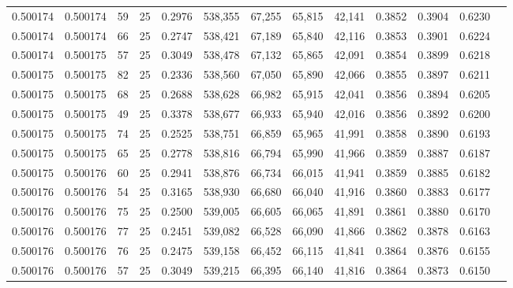\begin{tabular}{rrrrrrrrrrrrr}
0.500174 & 0.500174 &    59 &  25 &                                     0.2976 & 538,355 &  67,255 &  65,815 &  42,141 & 0.3852 & 0.3904 & 0.6230 \\
0.500174 & 0.500174 &    66 &  25 &                                     0.2747 & 538,421 &  67,189 &  65,840 &  42,116 & 0.3853 & 0.3901 & 0.6224 \\
0.500174 & 0.500175 &    57 &  25 &                                     0.3049 & 538,478 &  67,132 &  65,865 &  42,091 & 0.3854 & 0.3899 & 0.6218 \\
0.500175 & 0.500175 &    82 &  25 &                                     0.2336 & 538,560 &  67,050 &  65,890 &  42,066 & 0.3855 & 0.3897 & 0.6211 \\
0.500175 & 0.500175 &    68 &  25 &                                     0.2688 & 538,628 &  66,982 &  65,915 &  42,041 & 0.3856 & 0.3894 & 0.6205 \\
0.500175 & 0.500175 &    49 &  25 &                                     0.3378 & 538,677 &  66,933 &  65,940 &  42,016 & 0.3856 & 0.3892 & 0.6200 \\
0.500175 & 0.500175 &    74 &  25 &                                     0.2525 & 538,751 &  66,859 &  65,965 &  41,991 & 0.3858 & 0.3890 & 0.6193 \\
0.500175 & 0.500175 &    65 &  25 &                                     0.2778 & 538,816 &  66,794 &  65,990 &  41,966 & 0.3859 & 0.3887 & 0.6187 \\
0.500175 & 0.500176 &    60 &  25 &                                     0.2941 & 538,876 &  66,734 &  66,015 &  41,941 & 0.3859 & 0.3885 & 0.6182 \\
0.500176 & 0.500176 &    54 &  25 &                                     0.3165 & 538,930 &  66,680 &  66,040 &  41,916 & 0.3860 & 0.3883 & 0.6177 \\
0.500176 & 0.500176 &    75 &  25 &                                     0.2500 & 539,005 &  66,605 &  66,065 &  41,891 & 0.3861 & 0.3880 & 0.6170 \\
0.500176 & 0.500176 &    77 &  25 &                                     0.2451 & 539,082 &  66,528 &  66,090 &  41,866 & 0.3862 & 0.3878 & 0.6163 \\
0.500176 & 0.500176 &    76 &  25 &                                     0.2475 & 539,158 &  66,452 &  66,115 &  41,841 & 0.3864 & 0.3876 & 0.6155 \\
0.500176 & 0.500176 &    57 &  25 &                                     0.3049 & 539,215 &  66,395 &  66,140 &  41,816 & 0.3864 & 0.3873 & 0.6150 \\

\end{tabular}
